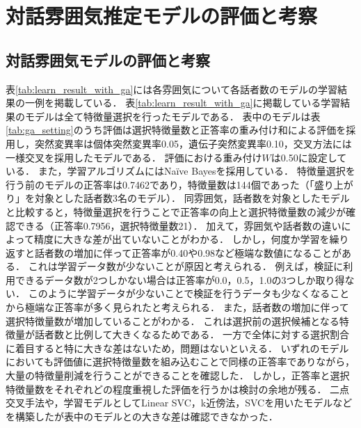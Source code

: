 \chapter{対話雰囲気推定モデルの評価と考察\label{sec:evaluate_estimation_model}}
\thispagestyle{plain}


\section{対話雰囲気モデルの評価と考察}

表\ref{tab:learn_result_with_ga}には各雰囲気について各話者数のモデルの学習結果の一例を掲載している．
表\ref{tab:learn_result_with_ga}に掲載している学習結果のモデルは全て特徴量選択を行ったモデルである．
表中のモデルは表\ref{tab:ga_setting}のうち評価は選択特徴量数と正答率の重み付け和による評価を採用し，突然変異率は個体突然変異率0.05，遺伝子突然変異率0.10，交叉方法には一様交叉を採用したモデルである．
評価における重み付け$W$は0.50に設定している．
また，学習アルゴリズムにはNaïve Bayesを採用している．
特徴量選択を行う前のモデルの正答率は0.7462であり，特徴量数は144個であった（「盛り上がり」を対象とした話者数3名のモデル）．
同雰囲気，話者数を対象としたモデルと比較すると，特徴量選択を行うことで正答率の向上と選択特徴量数の減少が確認できる（正答率0.7956，選択特徴量数21）．
加えて，雰囲気や話者数の違いによって精度に大きな差が出ていないことがわかる．
しかし，何度か学習を繰り返すと話者数の増加に伴って正答率が0.40や0.98など極端な数値になることがある．
これは学習データ数が少ないことが原因と考えられる．
例えば，検証に利用できるデータ数が2つしかない場合は正答率が0.0，0.5，1.0の3つしか取り得ない．
このように学習データが少ないことで検証を行うデータも少なくなることから極端な正答率が多く見られたと考えられる．
また，話者数の増加に伴って選択特徴量数が増加していることがわかる．
これは選択前の選択候補となる特徴量が話者数と比例して大きくなるためである．
一方で全体に対する選択割合に着目すると特に大きな差はないため，問題はないといえる．
いずれのモデルにおいても評価値に選択特徴量数を組み込むことで同様の正答率でありながら，大量の特徴量削減を行うことができることを確認した．
しかし，正答率と選択特徴量数をそれぞれどの程度重視した評価を行うかは検討の余地が残る．
二点交叉手法や，学習モデルとしてLinear SVC，k近傍法，SVCを用いたモデルなどを構築したが表中のモデルとの大きな差は確認できなかった．

